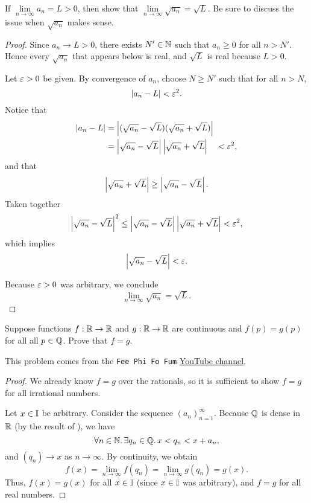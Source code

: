 \begin{problem}
  
  If $\lim\limits_{n \to \infty} a_n = L > 0$, then show that $\lim\limits_{n \to \infty} \sqrt{a_n} = \sqrt{L}$. Be sure to discuss
  the issue when $\sqrt{a_{n}}$ makes sense.

  \begin{proof}
    Since $a_{n} \to L > 0$, there exists $N' \in \mathbb{N}$ such that
    $a_{n} \ge 0$ for all $n > N'$.  Hence every $\sqrt{a_{n}}$ that appears
    below is real, and $\sqrt{L}$ is real because $L > 0$.

    Let $\varepsilon > 0$ be given. By convergence of $a_{n}$, choose $N \ge N'$ such that
    for all $n > N$,
    \[
      \left\lvert a_{n} - L \right\rvert< \varepsilon^{2}.
    \]
    Notice that 
    \begin{align*}
      \left\lvert a_{n} - L \right\rvert &= \left\lvert (\sqrt{a_n} - \sqrt{L})(\sqrt{a_n} + \sqrt{L}) \right\rvert \\
                      &= \left\lvert \sqrt{a_n} - \sqrt{L} \right\rvert\left\lvert \sqrt{a_n} + \sqrt{L} \right\rvert \quad < \varepsilon^{2},
    \end{align*}
    and that
    \[
      \left\lvert \sqrt{a_{n}} + \sqrt{L} \right\rvert \geq \left\lvert \sqrt{a_n} - \sqrt{L} \right\rvert.
    \]
    Taken together
    \[
      \left\lvert \sqrt{a_{n}} - \sqrt{L} \right\rvert^{2} \leq \left\lvert \sqrt{a_{n}} - \sqrt{L} \right\rvert\left\lvert \sqrt{a_{n}} + \sqrt{L} \right\rvert < \varepsilon^{2},
    \]
    which implies
    \[
      \left\lvert \sqrt{a_{n}} - \sqrt{L} \right\rvert < \varepsilon.
    \]

    Because $\varepsilon > 0$ was arbitrary, we conclude
    \[
      \lim_{n \to \infty} \sqrt{a_{n}} = \sqrt{L}.
    \]
  \end{proof}

\end{problem}

\begin{problem}
  Suppose functions $f : \mathbb{R} \to \mathbb{R}$ and $g : \mathbb{R} \to \mathbb{R}$ are continuous and $f(p) = g(p)$ for all all $p \in \mathbb{Q}$. Prove that
  $f = g$.

  \begin{callout}
    This problem comes from the \texttt{Fee Phi Fo Fum} \href{https://www.youtube.com/watch?v=OuwLcZQsDoY}{YouTube channel}.
  \end{callout}

  \begin{proof}
    We already know $f = g$ over the rationals, so it is sufficient to show $f = g$ for all irrational numbers.

    Let $x \in \mathbb{I}$ be arbitrary. Consider the sequence $(a_{n})_{n=1}^{\infty}$. Because
    $\mathbb{Q}$ is dense in $\mathbb{R}$ (by the result of ), we have
    \[
      \forall n \in \mathbb{N}.\, \exists q_{n} \in \mathbb{Q}.\, x < q_{n} < x + a_{n},
    \]
    and $(q_{n}) \to x$ as $n \to \infty$. By continuity, we obtain
    \[
      f(x) = \lim_{n \to \infty} f(q_{n}) = \lim_{n \to \infty} g(q_{n}) = g(x).
    \]
    Thus, $f(x) = g(x)$ for all $x \in \mathbb{I}$ (since $x \in \mathbb{I}$ was arbitrary), and $f = g$ for all real numbers.
  \end{proof}
\end{problem}

